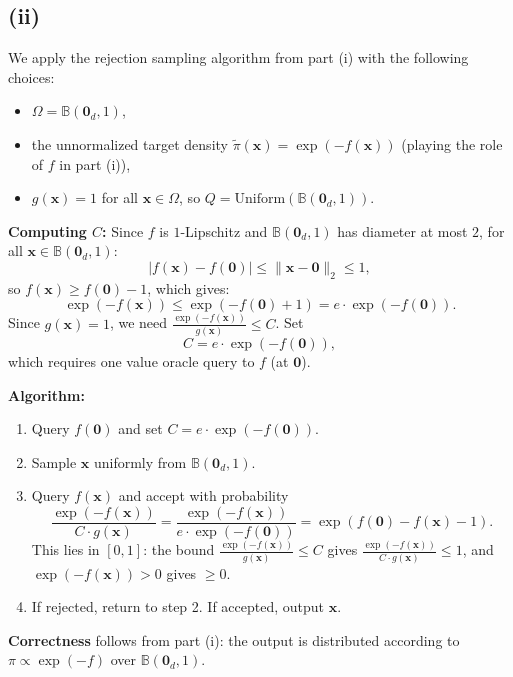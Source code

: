 \documentclass[12pt]{article}
\begin{document}
\subsection*{(ii)}

We apply the rejection sampling algorithm from part (i) with the following choices:
\begin{itemize}
\item $\Omega = \mathbb{B}(\mathbf{0}_d, 1)$,
\item the unnormalized target density $\tilde{\pi}(\mathbf{x}) = \exp(-f(\mathbf{x}))$ (playing the role of $f$ in part (i)),
\item $g(\mathbf{x}) = 1$ for all $\mathbf{x} \in \Omega$, so $Q = \mathrm{Uniform}(\mathbb{B}(\mathbf{0}_d, 1))$.
\end{itemize}

\textbf{Computing $C$:} Since $f$ is $1$-Lipschitz and $\mathbb{B}(\mathbf{0}_d, 1)$ has diameter at most $2$, for all $\mathbf{x} \in \mathbb{B}(\mathbf{0}_d, 1)$:
\[
|f(\mathbf{x}) - f(\mathbf{0})| \leq \|\mathbf{x} - \mathbf{0}\|_2 \leq 1,
\]
so $f(\mathbf{x}) \geq f(\mathbf{0}) - 1$, which gives:
\[
\exp(-f(\mathbf{x})) \leq \exp(-f(\mathbf{0}) + 1) = e \cdot \exp(-f(\mathbf{0})).
\]
Since $g(\mathbf{x}) = 1$, we need $\frac{\exp(-f(\mathbf{x}))}{g(\mathbf{x})} \leq C$. Set
\[
C = e \cdot \exp(-f(\mathbf{0})),
\]
which requires one value oracle query to $f$ (at $\mathbf{0}$).

\textbf{Algorithm:}
\begin{enumerate}
\item Query $f(\mathbf{0})$ and set $C = e \cdot \exp(-f(\mathbf{0}))$.
\item Sample $\mathbf{x}$ uniformly from $\mathbb{B}(\mathbf{0}_d, 1)$.
\item Query $f(\mathbf{x})$ and accept with probability
\[
\frac{\exp(-f(\mathbf{x}))}{C \cdot g(\mathbf{x})} = \frac{\exp(-f(\mathbf{x}))}{e \cdot \exp(-f(\mathbf{0}))} = \exp(f(\mathbf{0}) - f(\mathbf{x}) - 1).
\]
This lies in $[0,1]$: the bound $\frac{\exp(-f(\mathbf{x}))}{g(\mathbf{x})} \leq C$ gives $\frac{\exp(-f(\mathbf{x}))}{C \cdot g(\mathbf{x})} \leq 1$, and $\exp(-f(\mathbf{x})) > 0$ gives $\geq 0$.

\item If rejected, return to step 2. If accepted, output $\mathbf{x}$.
\end{enumerate}

\textbf{Correctness} follows from part (i): the output is distributed according to $\pi \propto \exp(-f)$ over $\mathbb{B}(\mathbf{0}_d, 1)$.
\end{document}
